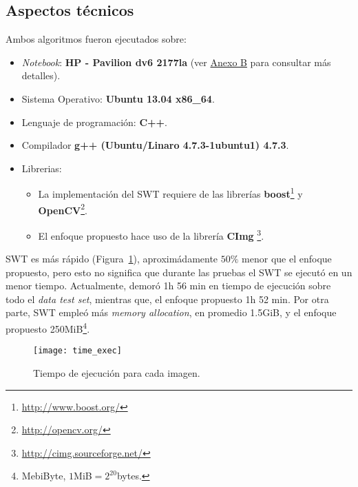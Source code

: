 \subsection{Aspectos técnicos}
Ambos algoritmos fueron ejecutados sobre:
\begin{itemize}
	\item \textit{Notebook}: \textbf{HP - Pavilion dv6 2177la} (ver 
	\hyperlink{page.86}{Anexo B} para consultar más detalles).
	\item Sistema Operativo: \textbf{Ubuntu 13.04 x86\_64}.
	\item Lenguaje de programación: \textbf{C++}.
	\item Compilador \textbf{g++ (Ubuntu/Linaro 4.7.3-1ubuntu1) 4.7.3}.
	\item Librerias:
	\begin{itemize}
		\item La implementación del SWT requiere de las librerías 
		\textbf{boost}\footnote{\url{http://www.boost.org/}} y
\textbf{OpenCV}\footnote{\url{http://opencv.org/}}.
		\item El enfoque propuesto hace uso de la librería \textbf{CImg}
		\footnote{\url{http://cimg.sourceforge.net/}}.
	\end{itemize}
\end{itemize}  

SWT es más rápido (Figura~\ref{fig:cap-resultados:time_exec}), 
aproximádamente $50\%$ menor que el enfoque propuesto,
pero esto no significa que durante las pruebas el SWT se
ejecutó en un menor tiempo. Actualmente, demoró 1h 56 min en tiempo de ejecución
sobre todo el \textit{data test set}, mientras que, el enfoque propuesto 1h 52 min.
Por otra parte, SWT empleó más \textit{memory allocation}, en promedio 1.5GiB, y
el enfoque propuesto 250MiB\footnote{MebiByte, $1$MiB$=2^{20}$bytes.}.


\begin{figure}[h!]
	\texttt{[image: time\_exec]}
	\caption{Tiempo de ejecución para cada imagen.}
	\label{fig:cap-resultados:time_exec}
\end{figure}

